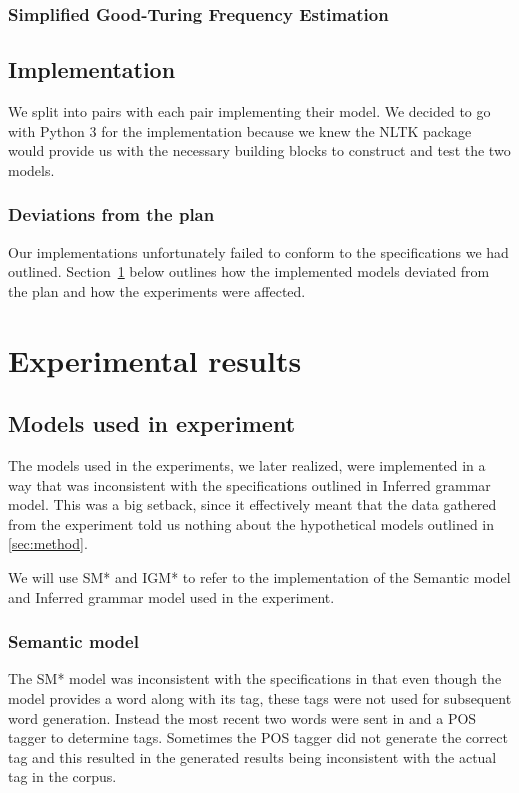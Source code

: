 \documentclass[a4paper,12pt]{article}
\begin{document}
\subsubsection{Simplified Good-Turing Frequency Estimation}


\subsection{Implementation}
\label{sec:impl}

We split into pairs with each pair implementing their model. We decided to go with Python 3 for the implementation because we knew the NLTK package would provide us with the necessary building blocks to construct and test the two models. 

\subsubsection{Deviations from the plan}
Our implementations unfortunately failed to conform to the specifications we had outlined. Section~\ref{sec:exps} below outlines how the implemented models deviated from the plan and how the experiments were affected.


\section{Experimental results}
\label{sec:exps}

\subsection{Models used in experiment}
The models used in the experiments, we later realized, were implemented in a way that was inconsistent with the specifications outlined in {Inferred grammar model}. This was a big setback, since it effectively meant that the data gathered from the experiment told us nothing about the hypothetical models outlined in \ref{sec:method}.

We will use SM* and IGM* to refer to the implementation of the Semantic model and Inferred grammar model used in the experiment.

\subsubsection{Semantic model}
The SM* model was inconsistent with the specifications in that even though the model provides a word along with its tag, these tags were not used for subsequent word generation. Instead the most recent two words were sent in and a POS tagger to determine tags. Sometimes the POS tagger did not generate the correct tag and this resulted in the generated results being inconsistent with the actual tag in the corpus.
\end{document}
